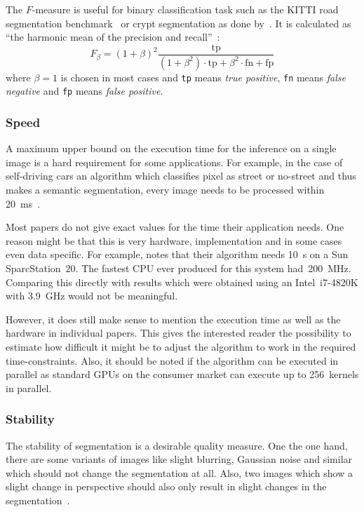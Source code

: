The $F$-measure is useful for binary classification task such as the KITTI road
segmentation benchmark~\cite{Fritsch2013ITSC} or crypt segmentation as done
by~\cite{cohen2015memory}. It is calculated as \enquote{the harmonic mean of
the precision and recall}~\cite{pantofaru2005comparison}:
\[F_\beta = (1+\beta)^2 \frac{\text{tp}}{(1+\beta^2)\cdot \text{tp}+ \beta^2 \cdot \text{fn} + \text{fp}}\]
where $\beta=1$ is chosen in most cases and \texttt{tp} means \textit{true
positive}, \texttt{fn} means \textit{false negative} and  \texttt{fp} means
\textit{false positive}.


\subsubsection{Speed}%
\label{subsubsec:speed-quality-measure}%
A maximum upper bound on the execution time for the inference on a single image
is a hard requirement for some applications. For example, in the case of
self-driving cars an algorithm which classifies pixel as street or no-street
and thus makes a semantic segmentation, every image needs to be processed
within \SI{20}{\milli\second}~\cite{bittel2015pixel}.

Most papers do not give exact values for the time their application needs. One
reason might be that this is very hardware, implementation and in some cases
even data specific. For example, \cite{hoover1996experimental} notes that their
algorithm needs \SI{10}{\second} on a Sun SparcStation~20. The fastest CPU ever
produced for this system had~\SI{200}{\mega\hertz}. Comparing this directly
with results which were obtained using an Intel~i7-4820K with
\SI{3.9}{\giga\hertz} would not be meaningful.

However, it does still make sense to mention the execution time as well as the
hardware in individual papers. This gives the interested reader the possibility
to estimate how difficult it might be to adjust the algorithm to work in the
required time-constraints. Also, it should be noted if the algorithm can be
executed in parallel as standard \glspl{GPU} on the consumer market can execute
up to 256~kernels in parallel.


\subsubsection{Stability}%
\label{subsubsec:stability-quality-measure}%
The stability of segmentation is a desirable quality measure. One the one hand,
there are some variants of images like slight blurring, Gaussian noise and
similar which should not change the segmentation at all. Also, two images which
show a slight change in perspective should also only result in slight changes
in the segmentation~\cite{pantofaru2005comparison}.

